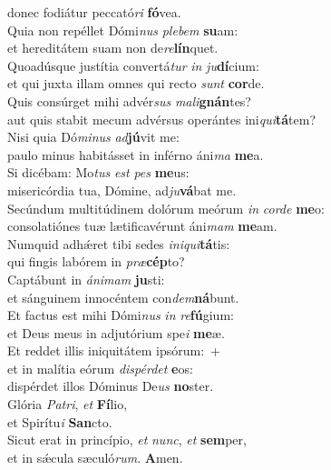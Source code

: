 \oddverse donec fodiátur peccató\textit{ri} \textbf{fó}vea.\\
\evenverse Quia non repéllet Dómi\textit{nus} \textit{ple}\textit{bem} \textbf{su}am:~\*\\
\evenverse et hereditátem suam non de\textit{re}\textbf{lín}quet.\\
\oddverse Quoadúsque justítia convertá\textit{tur} \textit{in} \textit{ju}\textbf{dí}cium:~\*\\
\oddverse et qui juxta illam omnes qui recto \textit{sunt} \textbf{cor}de.\\
\evenverse Quis consúrget mihi advér\textit{sus} \textit{ma}\textit{li}\textbf{gnán}tes?~\*\\
\evenverse aut quis stabit mecum advérsus operántes ini\textit{qui}\textbf{tá}tem?\\
\oddverse Nisi quia Dó\textit{mi}\textit{nus} \textit{ad}\textbf{jú}vit me:~\*\\
\oddverse paulo minus habitásset in inférno áni\textit{ma} \textbf{me}a.\\
\evenverse Si dicébam: Mo\textit{tus} \textit{est} \textit{pes} \textbf{me}us:~\*\\
\evenverse misericórdia tua, Dómine, ad\textit{ju}\textbf{vá}bat me.\\
\oddverse Secúndum multitúdinem dolórum meórum \textit{in} \textit{cor}\textit{de} \textbf{me}o:~\*\\
\oddverse consolatiónes tuæ lætificavérunt áni\textit{mam} \textbf{me}am.\\
\evenverse Numquid adhǽret tibi sedes \textit{i}\textit{ni}\textit{qui}\textbf{tá}tis:~\*\\
\evenverse qui fingis labórem in \textit{præ}\textbf{cép}to?\\
\oddverse Captábunt in \textit{á}\textit{ni}\textit{mam} \textbf{ju}sti:~\*\\
\oddverse et sánguinem innocéntem con\textit{dem}\textbf{ná}bunt.\\
\evenverse Et factus est mihi Dómi\textit{nus} \textit{in} \textit{re}\textbf{fú}gium:~\*\\
\evenverse et Deus meus in adjutórium spe\textit{i} \textbf{me}æ.\\
\oddverse Et reddet illis iniquitátem ipsórum:~+\\
\oddverse  et in malítia eórum \textit{di}\textit{spér}\textit{det} \textbf{e}os:~\*\\
\oddverse dispérdet illos Dóminus De\textit{us} \textbf{no}ster.\\
\evenverse Glória \textit{Pa}\textit{tri}, \textit{et} \textbf{Fí}lio,~\*\\
\evenverse et Spirítu\textit{i} \textbf{San}cto.\\
\oddverse Sicut erat in princípio, \textit{et} \textit{nunc}, \textit{et} \textbf{sem}per,~\*\\
\oddverse et in sǽcula sæculó\textit{rum}. \textbf{A}men.\\
